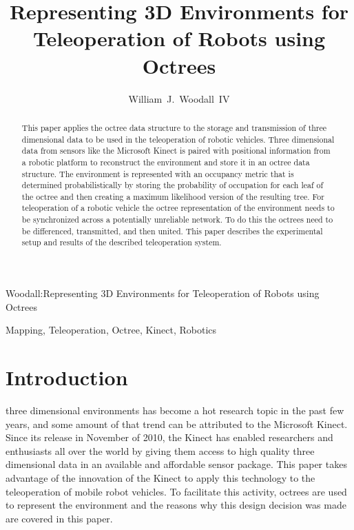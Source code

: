 \documentclass[journal]{IEEEtran}
\newcommand{\ThisPaperTitle}
{Representing 3D Environments for Teleoperation of Robots using Octrees}
\begin{document}
  
  \title{\ThisPaperTitle{}}
  
  \author{William~J.~Woodall~IV}
  
  {Woodall:\ThisPaperTitle{}}
  
  \maketitle
  
  \begin{abstract}
    This paper applies the octree data structure to the storage and
    transmission of three dimensional data to be used in the teleoperation of
    robotic vehicles. Three dimensional data from sensors like the Microsoft
    Kinect is paired with positional information from a robotic platform to
    reconstruct the environment and store it in an octree data structure. The
    environment is represented with an occupancy metric that is determined
    probabilistically by storing the probability of occupation for each leaf
    of the octree and then creating a maximum likelihood version of the
    resulting tree. For teleoperation of a robotic vehicle the octree
    representation of the environment needs to be synchronized across a
    potentially unreliable network. To do this the octrees need to be
    differenced, transmitted, and then united. This paper describes the
    experimental setup and results of the described teleoperation system.
  \end{abstract}
  
  \begin{IEEEkeywords}
    Mapping, Teleoperation, Octree, Kinect, Robotics
  \end{IEEEkeywords}
  
  \IEEEpeerreviewmaketitle
  
  \section{Introduction}
   three dimensional environments has become a hot 
  research topic in the past few years, and some amount of that trend can be 
  attributed to the Microsoft Kinect.  Since its release in November of 
  2010\cite{GIZMODO}, the Kinect has enabled researchers and enthusiasts all 
  over the world by giving them access to high quality three dimensional data 
  in an available and affordable sensor package.  This paper takes advantage 
  of the innovation of the Kinect to apply this technology to the 
  teleoperation of mobile robot vehicles.  To facilitate this activity, 
  octrees are used to represent the environment and the reasons why this 
  design decision was made are covered in this paper.
  
\end{document}
